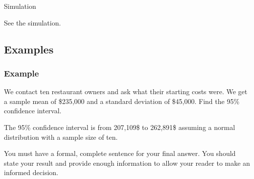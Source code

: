 \begin{frame}{Simulation}

  See the simulation.
  
\end{frame}

\subsection{Examples}

\begin{frame}
  \frametitle{Example}

  We contact ten restaurant owners and ask what their starting costs
  were. We get a sample mean of \$235,000 and a standard deviation of
  \$45,000. Find the 95\% confidence interval.

  \vfill

  {
    {\color{blue}
      The 95\% confidence interval is from 207,109\$ to 262,891\$
      assuming a normal distribution with a sample size of ten.
    }
  }

  \vfill

  {

    {\color{red}You must have a formal, complete sentence for your
      final answer. You should state your result and provide enough
      information to allow your reader to make an informed decision.}

  }

\end{frame}


